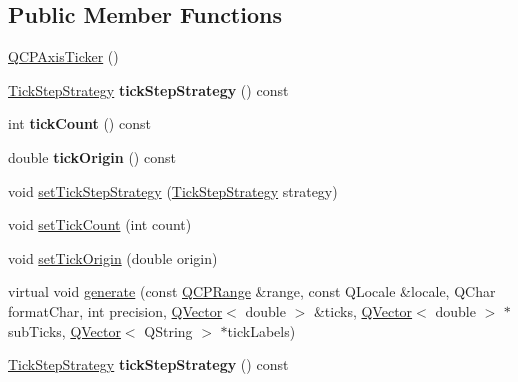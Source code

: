 \subsection*{Public Member Functions}
\begin{DoxyCompactItemize}
\item 
\hyperlink{class_q_c_p_axis_ticker_a8fcf23c79ebd72202fe79253f9f01ea8}{Q\+C\+P\+Axis\+Ticker} ()
\item 
\mbox{\label{class_q_c_p_axis_ticker_a58df76f2ec3eb48401bdd314b0e14ba1}} 
\hyperlink{class_q_c_p_axis_ticker_ab6d2f9d9477821623ac9bc4b21ddf49a}{Tick\+Step\+Strategy} {\bfseries tick\+Step\+Strategy} () const
\item 
\mbox{\label{class_q_c_p_axis_ticker_aaf9edbe4169ce55e216fd067cc139452}} 
int {\bfseries tick\+Count} () const
\item 
\mbox{\label{class_q_c_p_axis_ticker_ac0c6e9587c36fdeefb5518c00fe7ab15}} 
double {\bfseries tick\+Origin} () const
\item 
void \hyperlink{class_q_c_p_axis_ticker_a73b1d847c1a12159af6bfda4ebebe7d5}{set\+Tick\+Step\+Strategy} (\hyperlink{class_q_c_p_axis_ticker_ab6d2f9d9477821623ac9bc4b21ddf49a}{Tick\+Step\+Strategy} strategy)
\item 
void \hyperlink{class_q_c_p_axis_ticker_a47752abba8293e6dc18491501ae34008}{set\+Tick\+Count} (int count)
\item 
void \hyperlink{class_q_c_p_axis_ticker_ab509c7e500293bf66a8409f0d7c23943}{set\+Tick\+Origin} (double origin)
\item 
virtual void \hyperlink{class_q_c_p_axis_ticker_aefbd11725678ca824add8cf926cbc856}{generate} (const \hyperlink{class_q_c_p_range}{Q\+C\+P\+Range} \&range, const Q\+Locale \&locale, Q\+Char format\+Char, int precision, \hyperlink{class_q_vector}{Q\+Vector}$<$ double $>$ \&ticks, \hyperlink{class_q_vector}{Q\+Vector}$<$ double $>$ $\ast$sub\+Ticks, \hyperlink{class_q_vector}{Q\+Vector}$<$ Q\+String $>$ $\ast$tick\+Labels)
\item 
\mbox{\label{class_q_c_p_axis_ticker_a58df76f2ec3eb48401bdd314b0e14ba1}} 
\hyperlink{class_q_c_p_axis_ticker_ab6d2f9d9477821623ac9bc4b21ddf49a}{Tick\+Step\+Strategy} {\bfseries tick\+Step\+Strategy} () const
\item 

\end{DoxyCompactItemize}
